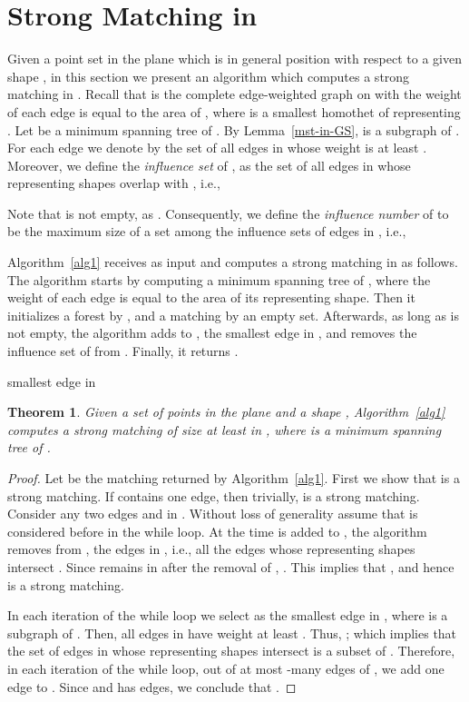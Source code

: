 \documentclass[11pt,a4paper]{article}
\newcommand{\SMGG}{\text{\em Strong-matching}}
\newtheorem{theorem}{Theorem}
\begin{document}
\section{Strong Matching in }
\label{algorithm-section}

Given a point set  in the plane which is in general position with respect to a given shape , in this section we present an algorithm which computes a strong matching in . Recall that  is the complete edge-weighted graph on  with the weight of each edge  is equal to the area of , where  is a smallest homothet of  representing . Let  be a minimum spanning tree of . By Lemma~\ref{mst-in-GS},  is a subgraph of . For each edge  we denote by  the set of all edges in  whose weight is at least . Moreover, we define the {\em influence set} of , as the set of all edges in  whose representing shapes overlap with , i.e.,


Note that  is not empty, as . Consequently, we define the {\em influence number} of  to be the maximum size of a set among the influence sets of edges in , i.e.,


Algorithm~\ref{alg1} receives  as input and computes a strong matching in  as follows. The algorithm starts by computing a minimum spanning tree  of , where the weight of each edge is equal to the area of its representing shape. Then it initializes a forest  by , and a matching  by an empty set. Afterwards, as long as  is not empty, the algorithm adds to , the smallest edge  in , and removes the influence set of  from . Finally, it returns .
\begin{algorithm}                      \caption{\SMGG}          \label{alg1} 
\begin{algorithmic}[1]
\State 
      \State 
      \State 
      \While {}
	  \State  smallest edge in 
\State 
	  \State 
	  \EndWhile
    \State \Return 
\end{algorithmic}
\end{algorithm}
\begin{theorem}
\label{GS-thr}
Given a set  of  points in the plane and a shape , Algorithm~\ref{alg1} computes a strong matching of size at least  in , where  is a minimum spanning tree of . 
\end{theorem}
\begin{proof}
Let  be the matching returned by Algorithm~\ref{alg1}. First we show that  is a strong matching. If  contains one edge, then trivially,  is a strong matching. Consider any two edges  and  in . Without loss of generality assume that  is considered before  in the {\sf while} loop. At the time  is added to , the algorithm removes from , the edges in , i.e., all the edges whose representing shapes intersect . Since  remains in  after the removal of , . This implies that , and hence  is a strong matching.

In each iteration of the {\sf while} loop we select  as the smallest edge in , where  is a subgraph of . Then, all edges in  have weight at least . Thus, ; which implies that the set of edges in  whose representing shapes intersect  is a subset of . Therefore, in each iteration of the {\sf while} loop, out of at most -many edges of , we add one edge to . Since  and  has  edges, we conclude that .
\end{proof}
\end{document}
